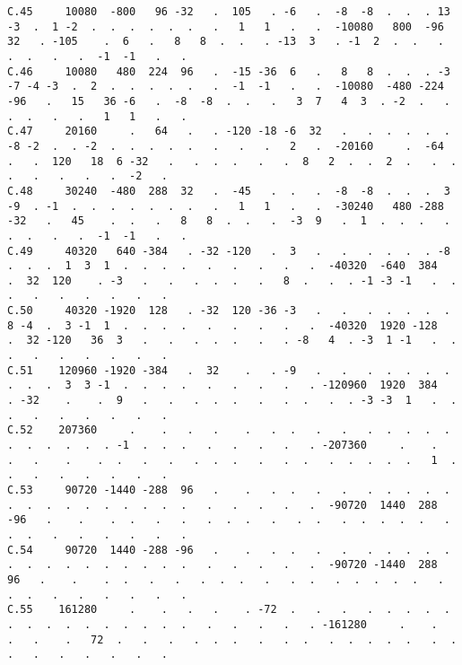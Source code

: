 \begin{verbatim}
C.45     10080  -800   96 -32   .  105   . -6   .  -8  -8  .  .  . 13 -3  .  1 -2  .  .  .  .  .  .   .   1   1   .   .  -10080   800  -96  32   . -105    .  6   .   8   8  .  .   . -13  3   . -1  2  .  .   .  .  .   .   .  -1  -1   .   .
C.46     10080   480  224  96   .  -15 -36  6   .   8   8  .  .  . -3 -7 -4 -3  .  2  .  .  .  .  .   .  -1  -1   .   .  -10080  -480 -224 -96   .   15   36 -6   .  -8  -8  .  .   .   3  7   4  3  . -2  .   .  .  .   .   .   1   1   .   .
C.47     20160     .   64   .   . -120 -18 -6  32   .   .  .  .  .  . -8 -2  .  . -2  .  .  .  .  .   .   .   .   2   .  -20160     .  -64   .   .  120   18  6 -32   .   .  .  .   .   .  8   2  .  .  2  .   .  .  .   .   .   .   .  -2   .
C.48     30240  -480  288  32   .  -45   .  .   .  -8  -8  .  .  .  3 -9  . -1  .  .  .  .  .  .  .   .   1   1   .   .  -30240   480 -288 -32   .   45    .  .   .   8   8  .  .   .  -3  9   .  1  .  .  .   .  .  .   .   .  -1  -1   .   .
C.49     40320   640 -384   . -32 -120   .  3   .   .   .  .  .  . -8  .  .  .  1  3  1  .  .  .  .   .   .   .   .   .  -40320  -640  384   .  32  120    . -3   .   .   .  .  .   .   8  .   .  . -1 -3 -1   .  .  .   .   .   .   .   .   .
C.50     40320 -1920  128   . -32  120 -36 -3   .   .   .  .  .  .  .  8 -4  .  3 -1  1  .  .  .  .   .   .   .   .   .  -40320  1920 -128   .  32 -120   36  3   .   .   .  .  .   .   . -8   4  . -3  1 -1   .  .  .   .   .   .   .   .   .
C.51    120960 -1920 -384   .  32    .   . -9   .   .   .  .  .  .  .  .  .  .  3  3 -1  .  .  .  .   .   .   .   .   . -120960  1920  384   . -32    .    .  9   .   .   .  .  .   .   .  .   .  . -3 -3  1   .  .  .   .   .   .   .   .   .
C.52    207360     .    .   .   .    .   .  .   .   .   .  .  .  .  .  .  .  .  .  .  . -1  .  .  .   .   .   .   .   . -207360     .    .   .   .    .    .  .   .   .   .  .  .   .   .  .   .  .  .  .  .   1  .  .   .   .   .   .   .   .
C.53     90720 -1440 -288  96   .    .   .  .   .   .   .  .  .  .  .  .  .  .  .  .  .  .  .  .  .   .   .   .   .   .  -90720  1440  288 -96   .    .    .  .   .   .   .  .  .   .   .  .   .  .  .  .  .   .  .  .   .   .   .   .   .   .
C.54     90720  1440 -288 -96   .    .   .  .   .   .   .  .  .  .  .  .  .  .  .  .  .  .  .  .  .   .   .   .   .   .  -90720 -1440  288  96   .    .    .  .   .   .   .  .  .   .   .  .   .  .  .  .  .   .  .  .   .   .   .   .   .   .
C.55    161280     .    .   .   .    . -72  .   .   .   .  .  .  .  .  .  .  .  .  .  .  .  .  .  .   .   .   .   .   . -161280     .    .   .   .    .   72  .   .   .   .  .  .   .   .  .   .  .  .  .  .   .  .  .   .   .   .   .   .   .

\end{verbatim}
